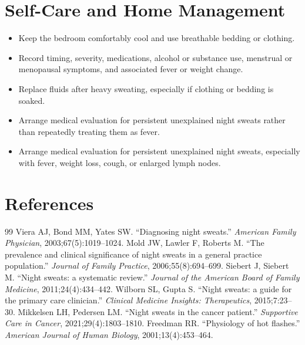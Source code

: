 \section*{Self-Care and Home Management}
\begin{itemize}
  \item Keep the bedroom comfortably cool and use breathable bedding or clothing.
  \item Record timing, severity, medications, alcohol or substance use, menstrual or menopausal symptoms, and associated fever or weight change.
  \item Replace fluids after heavy sweating, especially if clothing or bedding is soaked.
  \item Arrange medical evaluation for persistent unexplained night sweats rather than repeatedly treating them as fever.
  \item Arrange medical evaluation for persistent unexplained night sweats, especially with fever, weight loss, cough, or enlarged lymph nodes.
\end{itemize}

\section*{References}
\begin{thebibliography}{99}
 Viera AJ, Bond MM, Yates SW. ``Diagnosing night sweats.'' \textit{American Family Physician}, 2003;67(5):1019--1024.
 Mold JW, Lawler F, Roberts M. ``The prevalence and clinical significance of night sweats in a general practice population.'' \textit{Journal of Family Practice}, 2006;55(8):694--699.
 Siebert J, Siebert M. ``Night sweats: a systematic review.'' \textit{Journal of the American Board of Family Medicine}, 2011;24(4):434--442.
 Wilborn SL, Gupta S. ``Night sweats: a guide for the primary care clinician.'' \textit{Clinical Medicine Insights: Therapeutics}, 2015;7:23--30.
 Mikkelsen LH, Pedersen LM. ``Night sweats in the cancer patient.'' \textit{Supportive Care in Cancer}, 2021;29(4):1803--1810.
 Freedman RR. ``Physiology of hot flashes.'' \textit{American Journal of Human Biology}, 2001;13(4):453--464.

\end{thebibliography}
